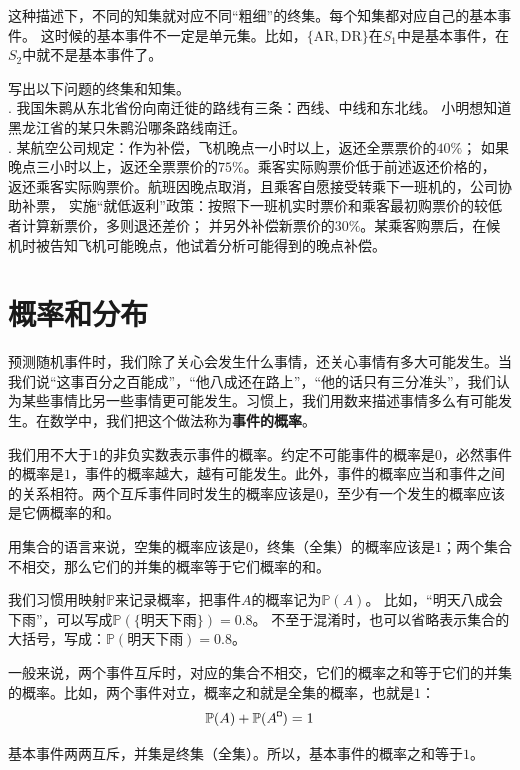 \documentclass[12pt,UTF8,fontset=none]{ctexbook}
\begin{document}
这种描述下，不同的知集就对应不同“粗细”的终集。每个知集都对应自己的基本事件。
这时候的基本事件不一定是单元集。比如，$\{\mbox{AR}, \mbox{DR}\}$在$S_1$中是基本事件，在$S_2$中就不是基本事件了。

\begin{xt}
    写出以下问题的终集和知集。\\
    . 我国朱鹮从东北省份向南迁徙的路线有三条：西线、中线和东北线。
    小明想知道黑龙江省的某只朱鹮沿哪条路线南迁。\\
    . 某航空公司规定：作为补偿，飞机晚点一小时以上，返还全票票价的$40\%$；
    如果晚点三小时以上，返还全票票价的$75\%$。乘客实际购票价低于前述返还价格的，
    返还乘客实际购票价。航班因晚点取消，且乘客自愿接受转乘下一班机的，公司协助补票，
    实施“就低返利”政策：按照下一班机实时票价和乘客最初购票价的较低者计算新票价，多则退还差价；
    并另外补偿新票价的$30\%$。某乘客购票后，在候机时被告知飞机可能晚点，他试着分析可能得到的晚点补偿。
\end{xt}

\section{概率和分布}

预测随机事件时，我们除了关心会发生什么事情，还关心事情有多大可能发生。当我们说“这事百分之百能成”，“他八成还在路上”，“他的话只有三分准头”，我们认为某些事情比另一些事情更可能发生。习惯上，我们用数来描述事情多么有可能发生。在数学中，我们把这个做法称为\textbf{事件的概率}。

我们用不大于$1$的非负实数表示事件的概率。约定不可能事件的概率是$0$，必然事件的概率是$1$，事件的概率越大，越有可能发生。此外，事件的概率应当和事件之间的关系相符。两个互斥事件同时发生的概率应该是$0$，至少有一个发生的概率应该是它俩概率的和。

用集合的语言来说，空集的概率应该是$0$，终集（全集）的概率应该是$1$；两个集合不相交，那么它们的并集的概率等于它们概率的和。

我们习惯用映射$\mathbb{P}$来记录概率，把事件$A$的概率记为$\mathbb{P}(A)$。
比如，“明天八成会下雨”，可以写成$\mathbb{P}(\{\mbox{明天下雨}\}) = 0.8$。
不至于混淆时，也可以省略表示集合的大括号，写成：$\mathbb{P}(\mbox{明天下雨}) = 0.8$。

一般来说，两个事件互斥时，对应的集合不相交，它们的概率之和等于它们的并集的概率。比如，两个事件对立，概率之和就是全集的概率，也就是$1$：
$$ \mathbb{P}(A) + \mathbb{P}(A^{\bu}) = 1 $$

基本事件两两互斥，并集是终集（全集）。所以，基本事件的概率之和等于$1$。
\end{document}
